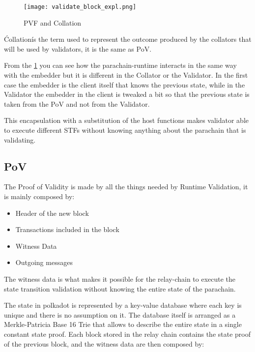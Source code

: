 \begin{figure}[h]
  \centering
  \texttt{[image: validate\_block\_expl.png]}
  \caption{PVF and Collation}
  \label{fig:pvf_pov}
\end{figure}

\'Collation\' is the term used to represent the outcome produced by the collators that will be used by validators, it is the same as PoV.


From the \ref{fig:pvf_pov} you can see how the parachain-runtime interacts in the same way with the embedder but it is different in the Collator or the Validator. In the first case the embedder is the client itself that knows the previous state, while in the Validator the embedder in the client is tweaked a bit so that the previous state is taken from the PoV and not from the Validator.

This encapsulation with a substitution of the host functions makes  validator able to execute different STFs without knowing anything about the parachain that is validating.

\subsection{PoV}

The Proof of Validity is made by all the things needed by Runtime Validation, it is mainly composed by:~\cite{cumulus-docs}

\begin{itemize}
  \item Header of the new block
  \item Transactions included in the block
  \item Witness Data
  \item Outgoing messages
\end{itemize}

The witness data is what makes it possible for the relay-chain to execute the state transition validation without knowing the entire state of the parachain.

The state in polkadot is represented by a key-value database where each key is unique and there is no assumption on it. The database itself is arranged as a Merkle-Patricia Base 16 Trie that allows to describe the entire state in a single constant state proof. Each block stored in the relay chain contains the state proof of the previous block, and the witness data are then composed by:



